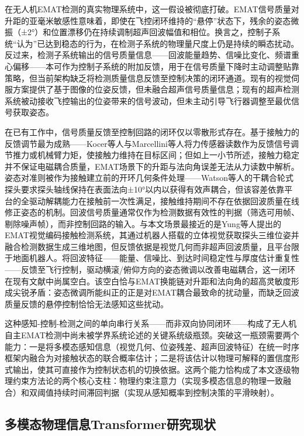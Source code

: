 在无人机EMAT检测的真实物理系统中，这一假设被彻底打破。EMAT信号质量对升距的亚毫米敏感性意味着，即使在飞控闭环维持的“悬停”状态下，残余的姿态微振（±2°）和位置漂移仍在持续调制超声回波幅值和相位。换言之，控制子系统“认为”已达到稳态的行为，在检测子系统的物理量尺度上仍是持续的瞬态扰动。反过来，检测子系统输出的信号质量信息——回波能量趋势、信噪比变化、频谱重心偏移——本可作为控制子系统的附加反馈，用于在信号质量下降时主动调整贴靠策略，但当前架构缺乏将检测质量信息反馈至控制决策的闭环通道。现有的视觉伺服方案提供了基于图像的位姿反馈，但未融合超声信号质量信息；现有的超声检测系统被动接收飞控输出的位姿带来的信号波动，但未主动引导飞行器调整至最优信号获取姿态。

在已有工作中，信号质量反馈至控制回路的闭环仅以零散形式存在。基于接触力的反馈调节最为成熟——Kocer等人与Marcellini等人将力传感器读数作为反馈信号调节推力或机械臂力矩，使接触力维持在目标区间；但如上一小节所述，接触力稳定并不保证电磁耦合质量，EMAT场景下的升距与法向角误差无法从力读数中解析。姿态对准则被作为接触建立前的开环几何条件处理——Watson等人的干耦合轮式探头要求探头轴线保持在表面法向±10°以内以获得有效声耦合，但该容差依靠平台的全驱动解耦能力在接触前一次性满足，接触维持期间不存在依据回波质量在线修正姿态的机制。回波信号质量通常仅作为检测数据有效性的判据（筛选可用帧、剔除噪声帧），而非控制回路的输入。与本文场景最接近的是Yung等人提出的EMAT视觉编码接触检测系统，其通过机器人搭载的立体视觉获取探头三维位姿并融合检测数据生成三维地图，但反馈依据是视觉几何而非超声回波质量，且平台限于地面机器人。将回波特征——能量、信噪比、到达时间稳定性与厚度估计重复性——反馈至飞行控制，驱动横滚/俯仰方向的姿态微调以改善电磁耦合，这一闭环在现有文献中尚属空白。该空白恰与EMAT换能链对升距和法向角的超高灵敏度形成尖锐矛盾：姿态微调所能纠正的正是对EMAT耦合最致命的扰动量，而缺乏回波质量反馈的悬停控制恰恰无法感知这些扰动。

这种感知-控制-检测之间的单向串行关系——而非双向协同闭环——构成了无人机自主EMAT检测中尚未被学界系统论述的关键系统级瓶颈。突破这一瓶颈需要两个能力：一是将多模态感知信息（视觉几何、位姿残差、超声回波特征）在统一时序框架内融合为对接触状态的联合概率估计；二是将该估计以物理可解释的置信度形式输出，使其可直接作为控制状态机的切换依据。这两个能力恰构成了本文逐级物理约束方法论的两个核心支柱：物理约束注意力（实现多模态信息的物理一致融合）和双阈值持续时间滞回判据（实现从感知概率到控制决策的平滑映射）。

\subsection{多模态物理信息Transformer研究现状}

